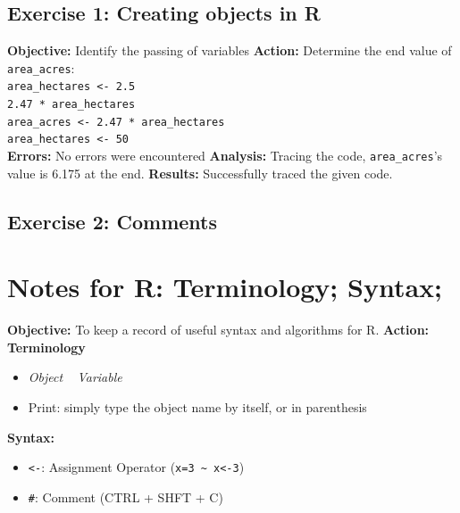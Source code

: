 \documentclass{article}
\begin{document}
\subsection{Exercise 1: Creating objects in R}
\textbf{Objective:} Identify the passing of variables
\textbf{Action:} Determine the end value of \texttt{area\_acres}:\\
\texttt{area\_hectares <- 2.5}\\
\texttt{2.47 * area\_hectares}\\
\texttt{area\_acres <- 2.47 * area\_hectares}\\
\texttt{area\_hectares <- 50}\\
\textbf{Errors:} No errors were encountered
\textbf{Analysis:} Tracing the code, \texttt{area\_acres}'s value is 6.175 at the end.
\textbf{Results:} Successfully traced the given code.

\subsection{Exercise 2: Comments}




\newpage
\section{Notes for R: Terminology; Syntax;}
\textbf{Objective:} To keep a record of useful syntax and algorithms for R.
\textbf{Action:}\\
\textbf{Terminology}
\begin{itemize}
    \item \textit{Object} ~ \textit{Variable}
    \item Print: simply type the object name by itself, or in parenthesis
\end{itemize}
\textbf{Syntax:}
\begin{itemize}
    \item \verb|<-|: Assignment Operator (\verb|x=3 ~ x<-3|)
    \item \verb|#|: Comment (CTRL + SHFT + C)
\end{itemize}
\end{document}
